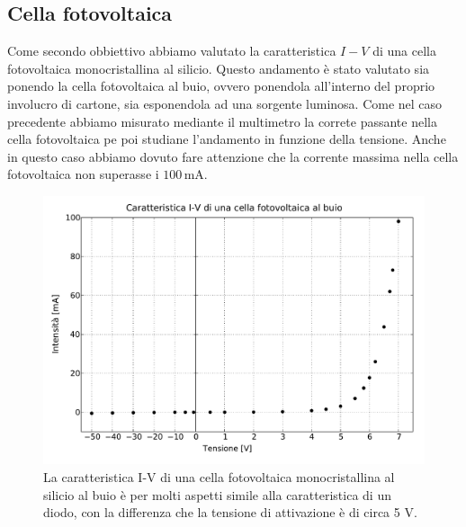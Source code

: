 \subsection*{Cella fotovoltaica}

Come secondo obbiettivo abbiamo valutato la caratteristica $I-V$ di una cella fotovoltaica monocristallina al silicio. Questo andamento è stato valutato sia ponendo la cella fotovoltaica al buio, ovvero ponendola all'interno del proprio involucro di cartone, sia esponendola ad una sorgente luminosa.
Come nel caso precedente abbiamo misurato mediante il multimetro la correte passante nella cella fotovoltaica pe poi studiane l'andamento in funzione della tensione.
Anche in questo caso abbiamo dovuto fare attenzione che la corrente massima nella cella fotovoltaica non superasse i $100\,\si{\milli\ampere}$.

\begin{figure}
    \includegraphics[scale=0.5]{buio.pdf}
    \caption{La caratteristica I-V di una cella fotovoltaica monocristallina al silicio al buio è per molti aspetti simile alla caratteristica di un diodo, con la differenza che la tensione di attivazione è di circa 5 V.}
    \label{fig:buio}
\end{figure}

